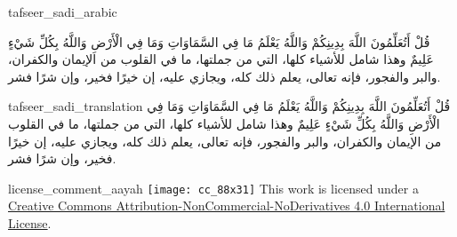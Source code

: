 \begin{taggedblock}{tafseer_sadi_arabic}
\begin{Arabic}
{ قُلْ أَتُعَلِّمُونَ اللَّهَ بِدِينِكُمْ وَاللَّهُ يَعْلَمُ مَا فِي السَّمَاوَاتِ وَمَا فِي الْأَرْضِ وَاللَّهُ بِكُلِّ شَيْءٍ عَلِيمٌ }
وهذا شامل للأشياء كلها، التي من جملتها، ما في القلوب من الإيمان والكفران، والبر والفجور، فإنه تعالى، يعلم ذلك كله، ويجازي عليه، إن خيرًا فخير، وإن شرًا فشر.
\end{Arabic}
\end{taggedblock}
\begin{taggedblock}{tafseer_sadi_translation}
{ قُلْ أَتُعَلِّمُونَ اللَّهَ بِدِينِكُمْ وَاللَّهُ يَعْلَمُ مَا فِي السَّمَاوَاتِ وَمَا فِي الْأَرْضِ وَاللَّهُ بِكُلِّ شَيْءٍ عَلِيمٌ }
وهذا شامل للأشياء كلها، التي من جملتها، ما في القلوب من الإيمان والكفران، والبر والفجور، فإنه تعالى، يعلم ذلك كله، ويجازي عليه، إن خيرًا فخير، وإن شرًا فشر.
\end{taggedblock}
\begin{taggedblock}{license_comment_aayah}
\texttt{[image: cc\_88x31]}
This work is licensed under a 
\href{http://creativecommons.org/licenses/by-nc-nd/4.0/}{Creative Commons Attribution-NonCommercial-NoDerivatives 4.0 International License}.
\end{taggedblock}
\begin{comment}
Please use the following for footnotes:- Sample\footnoteQ{Text of Qur'an footnote goes here.}.
Sample\footnoteT{Text of Tafseer footnote goes here.}.
\end{comment}